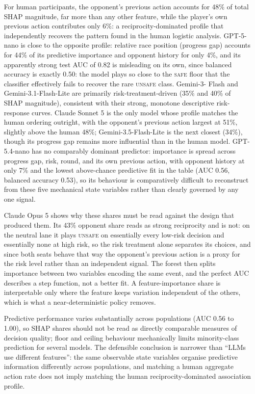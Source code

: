 \documentclass[sigconf]{aamas}
\newcommand{\Safe}{\textsc{safe}}
\newcommand{\Unsafe}{\textsc{unsafe}}
\begin{document}
For human participants, the opponent's previous action accounts for 48\%
of total SHAP magnitude, far more than any other feature, while the
player's own previous action contributes only 6\%: a reciprocity-dominated
profile that independently recovers the pattern found in the human
logistic analysis. GPT-5-nano is close to the opposite profile: relative
race position (progress gap) accounts for 44\% of its predictive
importance and opponent history for only 4\%, and its apparently strong
test AUC of 0.82 is misleading on its own, since balanced accuracy is
exactly 0.50: the model plays so close to the \Safe{} floor that the
classifier effectively fails to recover the rare \Unsafe{} class. Gemini-3-
Flash and Gemini-3.1-Flash-Lite are primarily risk-treatment-driven (35\%
and 40\% of SHAP magnitude), consistent with their strong, monotone
descriptive risk-response curves. Claude Sonnet 5 is the only model whose
profile matches the human ordering outright, with the opponent's previous
action largest at 51\%, slightly above the human 48\%;
Gemini-3.5-Flash-Lite is the next closest (34\%), though its progress gap
remains more influential than in the human model. GPT-5.4-nano has no
comparably dominant predictor: importance is
spread across progress gap, risk, round, and its own previous action,
with opponent history at only 7\% and the lowest above-chance predictive
fit in the table (AUC 0.56, balanced accuracy 0.53), so its behaviour is
comparatively difficult to reconstruct from these five mechanical state
variables rather than clearly governed by any one signal.

Claude Opus 5 shows why these shares must be read against the design that
produced them. Its 43\% opponent share reads as strong reciprocity and is
not: on the neutral lane it plays \Unsafe{} on essentially every low-risk
decision and essentially none at high risk, so the risk treatment alone
separates its choices, and since both seats behave that way the opponent's
previous action is a proxy for the risk level rather than an independent
signal. The forest then splits importance between two variables encoding
the same event, and the perfect AUC describes a step function, not a better
fit. A feature-importance share is interpretable only where the feature
keeps variation independent of the others, which is what a
near-deterministic policy removes.

Predictive performance varies substantially across populations (AUC 0.56
to 1.00), so SHAP shares should not be read as directly comparable measures
of decision quality; floor and ceiling behaviour mechanically limits
minority-class prediction for several models. The defensible
conclusion is narrower than ``LLMs use different features'': the same
observable state variables organise predictive information differently
across populations, and matching a human aggregate action rate does not
imply matching the human reciprocity-dominated association profile.
\end{document}
